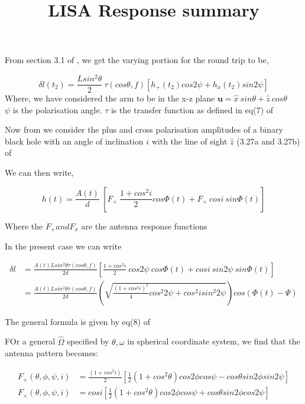 \documentclass[10pt,a4paper]{article}
\title{LISA Response summary}
\begin{document}
\maketitle


From section 3.1 of \cite{cornish}, we get the varying portion for the round trip to be,

\begin{equation}
\delta l(t_2) = \frac{L sin^2 \theta}{2} \ \tau(cos \theta,f) \left[ h_{+}(t_2) cos 2\psi + h_{x}(t_2) sin 2\psi \right]
\end{equation}
Where, we have considered the arm to be in the x-z plane $ \textbf{u} = \hat{x} \ sin \theta + \hat{z} \ cos \theta$ \\


$\psi$ is the polarisation angle. $\tau$ is the transfer function as defined in eq(7) of \cite{cornish}

Now from we consider the plus and cross polarisation amplitudes of a binary black hole with an angle of inclination $i$ with the line of sight $\hat{z}$ (3.27a and 3.27b) of \cite{whelan}

We can then write,

\begin{equation}
h(t) = \frac{A(t)}{d}\ \left[ F_{+} \ \frac{1+ cos^2 i}{2} cos\Phi(t) + F_{\times} \ cosi \ sin\Phi(t) \right]
\end{equation}

Where the $F_{+} and F_{x}$ are the antenna response functions

In the present case we can write 

\begin{align}
\delta l&=\frac{A(t) L sin^2 \theta \tau(cos \theta,f)}{2d} \left[\frac{1+cos^2 i}{2} \ cos 2\psi \ cos \Phi(t) + cos i \ sin 2\psi \ sin \Phi(t)\right]\\
&=\frac{A(t) L sin^2 \theta \tau(cos \theta,f)}{2d} \left( \sqrt{ \frac{(1+cos^2 i)^2}{4} cos^2 2\psi  + cos^2 i sin^2 2\psi} \right)cos(\Phi(t)-\Psi)
\end{align}


The general formula is given by eq(8) of \cite{cornish}

FOr a general $\hat{\Omega}$ specified by $\theta,\omega$ in spherical coordinate system, we find that the antenna pattern becomes:

\begin{align}
F_{+}(\theta,\phi,\psi,i)&=\frac{(1+cos^2 i)}{2} \left[\frac{1}{2}(1+ cos^2 \theta) cos2\phi cos\psi - cos\theta sin2\phi sin2\psi \right]\\
F_{\times}(\theta,\phi,\psi,i)&=cos i \left[\frac{1}{2}(1+ cos^2 \theta) cos2\phi cos\psi + cos\theta sin2\phi cos2\psi \right]\\ 
\end{align}
\end{document}
